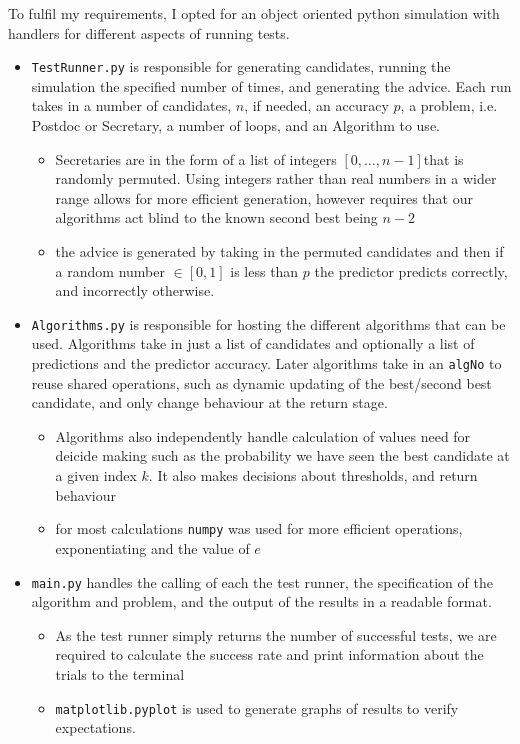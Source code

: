 \documentclass[a4paper,11pt]{article}
\begin{document}
To fulfil my requirements, I opted for an object oriented python simulation with handlers for different aspects of running tests.
\begin{itemize}
\item \verb|TestRunner.py| is responsible for generating candidates, running the simulation the specified number of times, and generating the advice. Each run takes in a number of candidates, $n$, if needed, an accuracy $p$, a problem, i.e. Postdoc or Secretary, a number of loops, and an Algorithm to use.

\begin{itemize}
\item Secretaries are in the form of a list of integers $[0, \dots ,n-1] $that is randomly permuted. Using integers rather than real numbers in a wider range allows for more efficient generation, however requires that our algorithms act blind to the known second best being $n-2$
\item the advice is generated by taking in the permuted candidates and then if a random number $\in [0,1]$ is less than $p$ the predictor predicts correctly, and incorrectly otherwise.
\end{itemize}

\item \verb|Algorithms.py| is responsible for hosting the different algorithms that can be used. Algorithms take in just a list of candidates and optionally a list of predictions and the predictor accuracy. Later algorithms take in an \verb|algNo| to reuse shared operations, such as dynamic updating of the best/second best candidate, and only change behaviour at the return stage.

\begin{itemize}
\item Algorithms also independently handle calculation of values need for deicide making such as the probability we have seen the best candidate at a given index $k$. It also makes decisions about thresholds, and return behaviour 
\item for most calculations \verb|numpy| was used for more efficient operations, exponentiating and the value of $e$
\end{itemize}

\item \verb|main.py| handles the calling of each the test runner, the specification of the algorithm and problem, and the output of the results in a readable format.

\begin{itemize}
\item As the test runner simply returns the number of successful tests, we are required to calculate the success rate and print information about the trials to the terminal
\item \verb|matplotlib.pyplot| is used to generate graphs of results to verify expectations.
\end{itemize}
\end{itemize}
\end{document}
